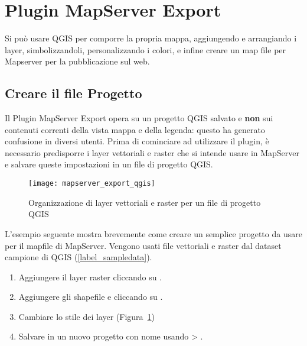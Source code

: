 
\section{Plugin MapServer Export}\label{sec:mapserver_export}


Si può usare QGIS per comporre la propria mappa, aggiungendo e arrangiando i layer, simbolizzandoli, 
personalizzando i colori, e infine creare un map file per Mapserver per la pubblicazione sul web. 

\subsection{Creare il file Progetto}

Il Plugin MapServer Export opera su un progetto QGIS salvato e \textbf{non} sui contenuti correnti 
della vista mappa e della legenda: questo ha generato confusione in diversi utenti.
Prima di cominciare ad utilizzare il plugin, è necessario predisporre i layer vettoriali e raster 
che si intende usare in MapServer e salvare queste impostazioni in un file di progetto QGIS.

\begin{figure}[ht]
\centering
  \texttt{[image: mapserver\_export\_qgis]}
   \caption{Organizzazione di layer vettoriali e raster per un file di progetto QGIS \wincaption}
  \label{fig:mapserver_export_qgs}
\end{figure}

L'esempio seguente mostra brevemente come creare un semplice progetto da usare per il mapfile di MapServer. 
Vengono usati file vettoriali e raster dal dataset campione di QGIS (\ref{label_sampledata}).

\begin{enumerate}
\item Aggiungere il layer raster  cliccando su 
.
\item Aggiungere gli shapefile  e 
 cliccando su  .
\item Cambiare lo stile dei layer (Figura~\ref{fig:mapserver_export_qgs})
\item Salvare in un nuovo progetto con nome  usando 
 > .
\end{enumerate} 

